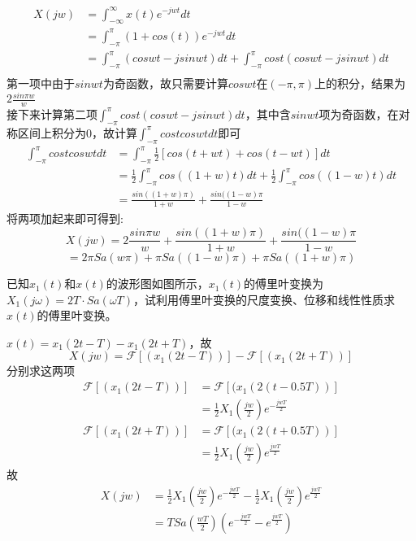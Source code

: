 \documentclass[answers]{exam}  %
\begin{document}
\begin{questions}
\begin{solution}
	\begin{align*}
	X(jw)&=\int_{-\infty}^{\infty}x(t)e^{-jwt}dt\\
	&=\int_{-\pi}^{\pi}(1+cos(t))e^{-jwt}dt\\
	&=\int_{-\pi}^{\pi}(coswt-jsinwt)dt+\int_{-\pi}^{\pi}cost(coswt-jsinwt)dt\\	
	\end{align*}
第一项中由于$sinwt$为奇函数，故只需要计算$coswt$在$(-\pi,\pi)$上的积分，结果为$2\frac{sin\pi w}{w}$\\
接下来计算第二项$\int_{-\pi}^{\pi}cost(coswt-jsinwt)dt$，其中含$sinwt$项为奇函数，在对称区间上积分为0，故计算$\int_{-\pi}^{\pi}costcoswtdt$即可\\
\begin{align*}
	\int_{-\pi}^{\pi}costcoswtdt&=\int_{-\pi}^{\pi}\frac{1}{2}[cos(t+wt)+cos(t-wt)]dt\\
	&=\frac{1}{2}\int_{-\pi}^{\pi}cos((1+w)t)dt+\frac{1}{2}\int_{-\pi}^{\pi}cos((1-w)t)dt\\
	&=\frac{sin((1+w)\pi)}{1+w}+\frac{sin((1-w)\pi}{1-w}
\end{align*}
将两项加起来即可得到:\\
$$X(jw)=2\frac{sin\pi w}{w}+\frac{sin((1+w)\pi)}{1+w}+\frac{sin((1-w)\pi}{1-w}$$
$$=2\pi Sa(w\pi)+\pi Sa((1-w)\pi)+\pi Sa((1+w)\pi)$$

\end{solution}

\newpage
\question 已知$x_1(t)$和$x(t)$的波形图如图所示，$x_1(t)$的傅里叶变换为$X_1(j\omega)=2T \cdot Sa(\omega T)$，试利用傅里叶变换的尺度变换、位移和线性性质求$x(t)$的傅里叶变换。



\begin{solution}
	$x(t)=x_1(2t-T)-x_1(2t+T)$，故$$X(jw)=\mathcal{F}[(x_1(2t-T))]-\mathcal{F}[(x_1(2t+T))]$$
	分别求这两项\\
	\begin{align*}
		\mathcal{F}[(x_1(2t-T))]&=\mathcal{F}[(x_1(2(t-0.5T))]\\
		&=\frac{1}{2}X_1(\frac{jw}{2})e^{-\frac{jwT}{2}}
	\end{align*}
	\begin{align*}
		\mathcal{F}[(x_1(2t+T))]&=\mathcal{F}[(x_1(2(t+0.5T))]\\
		&=\frac{1}{2}X_1(\frac{jw}{2})e^{\frac{jwT}{2}}
	\end{align*}
	故\\
	\begin{align*}
		X(jw)&=\frac{1}{2}X_1(\frac{jw}{2})e^{-\frac{jwT}{2}}-\frac{1}{2}X_1(\frac{jw}{2})e^{\frac{jwT}{2}}\\
		&=TSa(\frac{wT}{2})(e^{-\frac{jwT}{2}}-e^{\frac{jwT}{2}})
	\end{align*}
\end{solution}


\end{questions}
\end{document}
